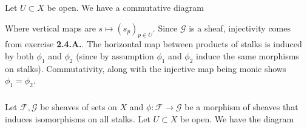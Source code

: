 \documentclass{article}
\newcommand{\Fsheaf}{\mathscr{F}}
\newcommand{\Gsheaf}{\mathscr{G}}
\newcommand{\exercise}{\subsubsection} %
\begin{document}
\exercise{} Let $U \subset X$ be open. We have a commutative diagram
\begin{center}
\end{center}
Where vertical maps are $s \mapsto (s_p)_{p \in U}$. Since $\Gsheaf$ is a sheaf, injectivity comes from exercise \textbf{2.4.A.}. The horizontal map between products of stalks is induced by both $\phi_1$ and $\phi_2$ (since by assumption $\phi_1$ and $\phi_2$ induce the same morphisms on stalks). Commutativity, along with the injective map being monic shows $\phi_1 = \phi_2$.

\exercise{} Let $\Fsheaf,\Gsheaf$ be sheaves of sets on $X$ and $\phi : \Fsheaf \to \Gsheaf$ be a morphism of sheaves that induces isomorphisms on all stalks. Let $U \subset X$ be open. We have the diagram
\begin{center}
\end{center}
\end{document}

